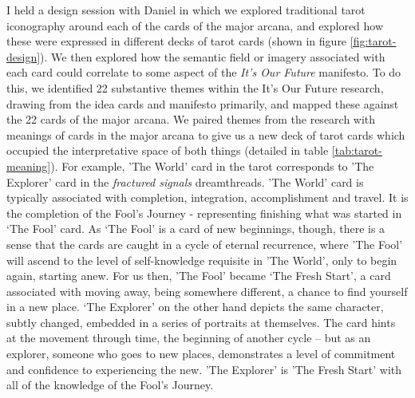 I held a design session with Daniel in which we explored traditional tarot iconography around each of the cards of the major arcana, and explored how these were expressed in different decks of tarot cards (shown in figure \ref{fig:tarot-design}). We then explored how the semantic field or imagery associated with each card could correlate to some aspect of the \emph{It’s Our Future} manifesto. To do this, we identified 22 substantive themes within the It’s Our Future research, drawing from the idea cards and manifesto primarily, and  mapped these against the 22 cards of the major arcana. We paired themes from the research with meanings of cards in the major arcana to give us a new deck of tarot cards which occupied the interpretative space of both things (detailed in table \ref{tab:tarot-meaning}). For example, 'The World' card in the tarot corresponds to 'The Explorer' card in the \textit{fractured signals} dreamthreads. ’The World’ card is typically associated with completion, integration, accomplishment and travel. It is the completion of the Fool’s Journey -  representing finishing what was started in ‘The Fool’ card. As ‘The Fool’ is a card of new beginnings, though, there is a sense that the cards are caught in a cycle of eternal recurrence, where 'The Fool' will ascend to the level of self-knowledge requisite in 'The World', only to begin again, starting anew. For us then, 'The Fool' became ‘The Fresh Start’, a card associated with moving away, being somewhere different, a chance to find yourself in a new place. ‘The Explorer’ on the other hand depicts the same character, subtly changed, embedded in a series of portraits at themselves. The card hints at the movement through time, the beginning of another cycle – but as an explorer, someone who goes to new places, demonstrates a level of commitment and confidence to experiencing the new. 'The Explorer' is 'The Fresh Start' with all of the knowledge of the Fool’s Journey. 


